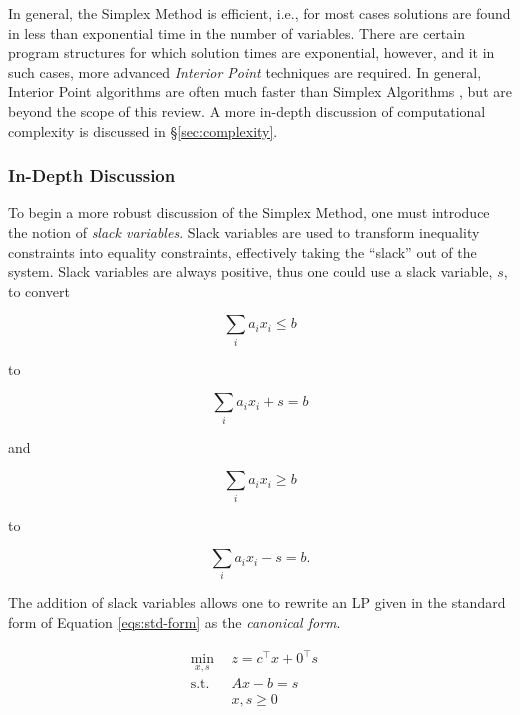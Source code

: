 In general, the Simplex Method is efficient, i.e., for most cases solutions are
found in less than exponential time in the number of variables. There are
certain program structures for which solution times are exponential, however,
and it in such cases, more advanced \textit{Interior Point} techniques are
required. In general, Interior Point algorithms are often much faster than
Simplex Algorithms \cite{ferris_linear_2008}, but are beyond the scope of this
review. A more in-depth discussion of computational complexity is discussed
in \S \ref{sec:complexity}.

\subsubsection{In-Depth Discussion}
To begin a more robust discussion of the Simplex Method, one must introduce the
notion of \textit{slack variables}. Slack variables are used to transform
inequality constraints into equality constraints, effectively taking the
``slack'' out of the system. Slack variables are always positive, thus one could
use a slack variable, $s$, to convert

\begin{equation}
  \sum_{i} a_i x_i \leq b
\end{equation}

to 

\begin{equation}
  \sum_{i} a_i x_i + s = b
\end{equation}

and

\begin{equation}
  \sum_{i} a_i x_i \geq b
\end{equation}

to 

\begin{equation}
  \sum_{i} a_i x_i - s = b.
\end{equation}

The addition of slack variables allows one to rewrite an LP given in the
standard form of Equation \ref{eqs:std-form} as the \textit{canonical form}.

\begin{subequations}\label{eqs:can-form}
  \begin{align}
    \min_{x, s} \:\: & 
    z =  c^{\top} x + 0^{\top} s
    & \label{eqs:can-form_obj} \\
    \text{s.t.} \:\: &
    A x - b = s
    & \label{eqs:can-form_sup} \\
    &
    x, s \geq 0
    &\label{eqs:can-form_x}
  \end{align}
\end{subequations}

